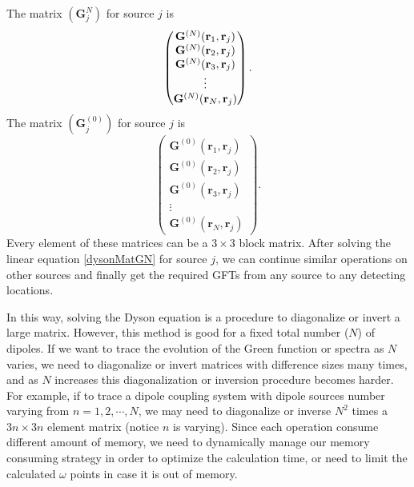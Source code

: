 The matrix $(\mathbf{G}^N_j)$ for source $j$ is
\begin{equation}
\begin{pmatrix}
\mathbf{G}^{(N)}(\mathbf{r}_1,\mathbf{r}_j)\\
\mathbf{G}^{(N)}(\mathbf{r}_2,\mathbf{r}_j)\\
\mathbf{G}^{(N)}(\mathbf{r}_3,\mathbf{r}_j)\\
\vdots\\
\mathbf{G}^{(N)}(\mathbf{r}_N,\mathbf{r}_j)
\end{pmatrix}.
\end{equation}
The matrix $(\mathbf{G}^{(0)}_j)$ for source $j$ is
\begin{equation}
\begin{pmatrix}
\mathbf{G}^{(0)}(\mathbf{r}_1,\mathbf{r}_j)\\
\mathbf{G}^{(0)}(\mathbf{r}_2,\mathbf{r}_j)\\
\mathbf{G}^{(0)}(\mathbf{r}_3,\mathbf{r}_j)\\
\vdots\\
\mathbf{G}^{(0)}(\mathbf{r}_N,\mathbf{r}_j)
\end{pmatrix}.
\end{equation}
Every element of these matrices can be a $3\times 3$ block matrix. After solving the linear equation \ref{dysonMatGN} for source $j$, we can continue similar operations on other sources and finally get the required GFTs from any source to any detecting locations.

In this way, solving the Dyson equation is a procedure to diagonalize or invert a large matrix. However, this method is good for a fixed total number ($N$) of dipoles. If we want to trace the evolution of the Green function or spectra as $N$ varies, we need to diagonalize or invert matrices with difference sizes many times, and as $N$ increases this diagonalization or inversion procedure becomes harder. For example, if to trace a dipole coupling system with dipole sources number varying from $n=1,2,\cdots,N$, we may need to diagonalize or inverse $N^2$ times a $3n\times 3n$ element matrix (notice $n$ is varying). Since each operation consume different amount of memory, we need to dynamically manage our memory consuming strategy in order to optimize the calculation time, or need to limit the calculated $\omega$ points in case it is out of memory.

